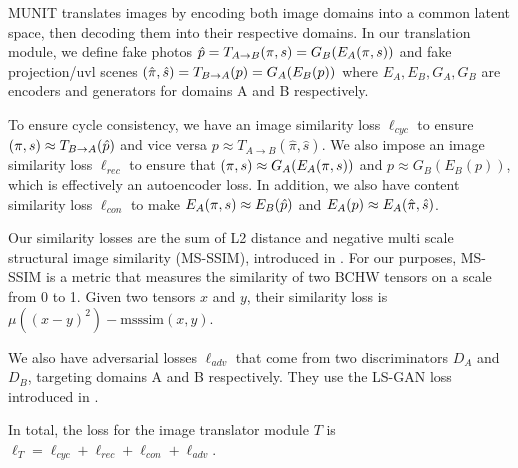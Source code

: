 \documentclass{article}
\begin{document}
	MUNIT translates images by encoding both image domains into a common latent space, then decoding them into their respective domains.
	In our translation module, we define fake photos $\hat{p} = T_{A\rightarrow B}(\pi,s) = G_B(E_A(\pi,s))$ and fake projection/uvl scenes $(\hat{\pi},\hat{s}) = T_{B\rightarrow A}(p) = G_A(E_B(p))$
		where $E_A, E_B, G_A, G_B$ are encoders and generators for domains A and B respectively.


	To ensure cycle consistency, we have an image similarity loss $\ell_{cyc}$ to ensure
	$(\pi,s) \approx T_{B\rightarrow A}(\hat{p})$
	and vice versa
	$p \approx T_{A\rightarrow B}(\hat{\pi},\hat{s})$.
	We also impose an image similarity loss $\ell_{rec}$ to ensure that $(\pi,s) \approx G_A(E_A(\pi,s))$ and $p \approx G_B(E_B(p))$, which is effectively an autoencoder loss. 
	In addition, we also have content similarity loss $ \ell_{con}$ to make 
	$E_A(\pi,s) \approx E_B(\hat{p})$ and $E_A(p) \approx E_A(\hat{\pi},\hat{s})$.

	Our similarity losses are the sum of L2 distance and negative multi scale structural image similarity (MS-SSIM), introduced in \citep{msssim}. For our purposes, MS-SSIM is a metric that measures the similarity of two BCHW tensors on a scale from 0 to 1. Given two tensors $x$ and $y$, their similarity loss is $\mu\left((x-y)^2\right) - \text{msssim}(x,y)$. 

	We also have adversarial losses $\ell_{adv}$ that come from two discriminators $D_A$ and $D_B$, targeting domains A and B respectively. They use the LS-GAN loss introduced in \citep{lsgan}.

	In total, the loss for the image translator module $T$ is $\ell_T=\ell_{cyc}+\ell_{rec}+\ell_{con}+\ell_{adv}$.

\end{document}
